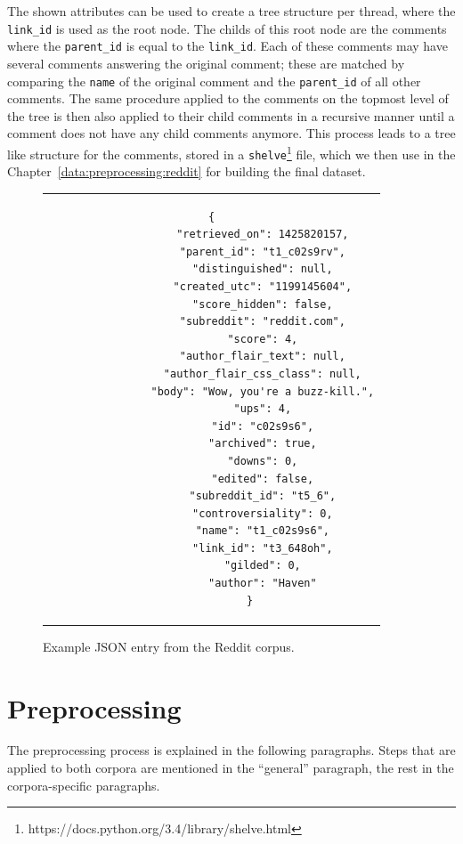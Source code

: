 The shown attributes can be used to create a tree structure per thread, where the \texttt{link\_id} is used as the root node. The childs of this root node are the comments where the \texttt{parent\_id} is equal to the \texttt{link\_id}. Each of these comments may have several comments answering the original comment; these are matched by comparing the \texttt{name} of the original comment and the \texttt{parent\_id} of all other comments. The same procedure applied to the comments on the topmost level of the tree is then also applied to their child comments in a recursive manner until a comment does not have any child comments anymore. This process leads to a tree like structure for the comments, stored in a \texttt{shelve}\footnote{https://docs.python.org/3.4/library/shelve.html} file, which we then use in the Chapter~\ref{data:preprocessing:reddit} for building the final dataset.
\\
\begin{figure}[thp]
	\centering
	\begin{tabular}{c}  %
		\begin{lstlisting}[style=json,label=data:reddit:json_example]
			{
				"retrieved_on": 1425820157,
				"parent_id": "t1_c02s9rv",
				"distinguished": null,
				"created_utc": "1199145604",
				"score_hidden": false,
				"subreddit": "reddit.com",
				"score": 4,
				"author_flair_text": null,
				"author_flair_css_class": null,
				"body": "Wow, you're a buzz-kill.",
				"ups": 4,
				"id": "c02s9s6",
				"archived": true,
				"downs": 0,
				"edited": false,
				"subreddit_id": "t5_6",
				"controversiality": 0,
				"name": "t1_c02s9s6",
				"link_id": "t3_648oh",
				"gilded": 0,
				"author": "Haven"
			}
		\end{lstlisting}
	\end{tabular}
	\caption{Example JSON entry from the Reddit corpus.}
\end{figure}

\section{Preprocessing}
The preprocessing process is explained in the following paragraphs. Steps that are applied to both corpora are mentioned in the ``general'' paragraph, the rest in the corpora-specific paragraphs.

